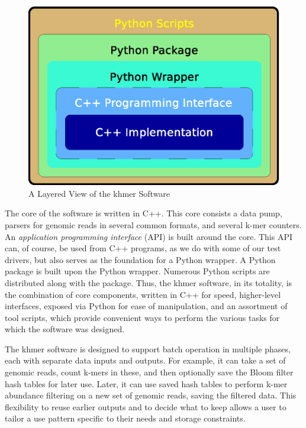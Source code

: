 \documentclass{article}
\begin{document}
\begin{figure}[ht!]
\centering
\includegraphics[scale=0.6]{layers.eps}
\caption{A Layered View of the khmer Software}
\label{khmerLayers}
\end{figure}

The core of the software is written in C++. This core consists a data pump, parsers for genomic reads in several common formats, and several k-mer counters. An \textit{application programming interface} (API) is built around the core. This API can, of course, be used from C++ programs, as we do with some of our test drivers, but also serves as the foundation for a Python wrapper. A Python package is built upon the Python wrapper. Numerous Python scripts are distributed along with the package. Thus, the khmer software, in its totality, is the combination of core components, written in C++ for speed, higher-level interfaces, exposed via Python for ease of manipulation, and an assortment of tool scripts, which provide convenient ways to perform the various tasks for which the software was designed.

The khmer software is designed to support batch operation in multiple phases, each with separate data inputs and outputs. For example, it can take a set of genomic reads, count k-mers in these, and then optionally save the Bloom filter hash tables for later use. Later, it can use saved hash tables to perform k-mer abundance filtering on a new set of genomic reads, saving the filtered data. This flexibility to reuse earlier outputs and to decide what to keep allows a user to tailor a use pattern specific to their needs and storage constraints.
\end{document}
